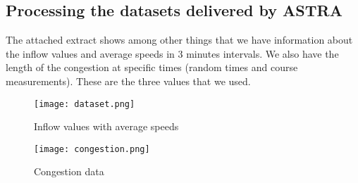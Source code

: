 \subsection{Processing the datasets delivered by ASTRA}
The attached extract shows among other things that we have information about the inflow values and average speeds in 3 minutes intervals. We also have the length of the congestion at specific times (random times and course measurements). These are the three values that we used.

\begin{figure}[h]
\texttt{[image: dataset.png]}
\caption{Inflow values with average speeds}
\end{figure}

\begin{figure}[h]
\texttt{[image: congestion.png]}
\caption{Congestion data}
\end{figure}